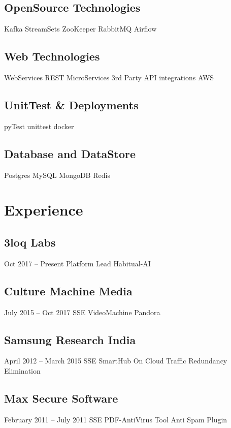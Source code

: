 \documentclass[]{deedy-resume-openfont}
\begin{document}
\begin{minipage}[t]{0.33\textwidth}
\subsection{OpenSource Technologies}
Kafka \textbullet{} StreamSets  \textbullet{}  ZooKeeper  \textbullet{} RabbitMQ \textbullet{} Airflow

\subsection{Web Technologies}
WebServices \textbullet{} REST  \textbullet{}  MicroServices  \textbullet{} 3rd Party API integrations \textbullet{} AWS

\subsection{UnitTest \& Deployments}
pyTest \textbullet{} unittest  \textbullet{}  docker 

\subsection{Database and DataStore}
Postgres \textbullet{} MySQL  \textbullet{}  MongoDB  \textbullet{} Redis

\sectionsep


\section{Experience} 
\subsection{3loq Labs}
Oct 2017 – Present \textbullet{} Platform Lead \textbullet{} Habitual-AI
\subsection{Culture Machine Media}
July 2015 – Oct 2017 \textbullet{} SSE \textbullet{} VideoMachine \textbullet{} Pandora
\subsection{Samsung Research India}
April 2012 – March 2015 \textbullet{} SSE \textbullet{} SmartHub On Cloud \textbullet{} Traffic Redundancy Elimination
\subsection{Max Secure Software}
February 2011 – July 2011 \textbullet{} SSE \textbullet{} PDF-AntiVirus Tool  \textbullet{} Anti Spam Plugin

\end{minipage}
\end{document}

